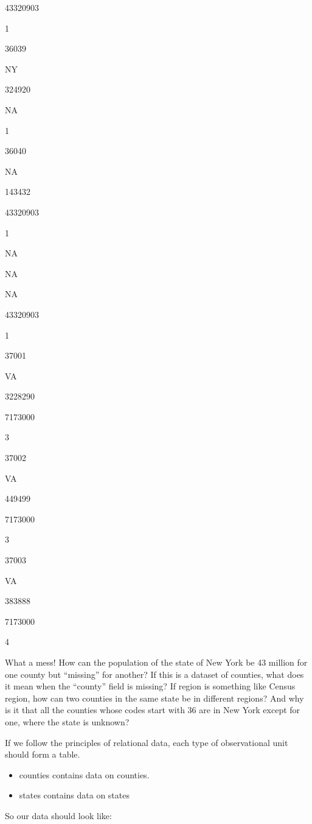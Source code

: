 \documentclass[]{book}
\providecommand{\tightlist}{%
  \setlength{\itemsep}{0pt}\setlength{\parskip}{0pt}}
\begin{document}
43320903

1

36039

NY

324920

NA

1

36040

NA

143432

43320903

1

NA

NA

NA

43320903

1

37001

VA

3228290

7173000

3

37002

VA

449499

7173000

3

37003

VA

383888

7173000

4

What a mess! How can the population of the state of New York be 43
million for one county but ``missing'' for another? If this is a dataset
of counties, what does it mean when the ``county'' field is missing? If
region is something like Census region, how can two counties in the same
state be in different regions? And why is it that all the counties whose
codes start with 36 are in New York except for one, where the state is
unknown?

If we follow the principles of relational data, each type of
observational unit should form a table.

\begin{itemize}
\tightlist
\item
  counties contains data on counties.
\item
  states contains data on states
\end{itemize}

So our data should look like:
\end{document}
